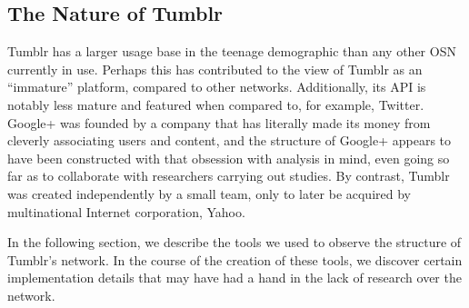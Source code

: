 \subsection{The Nature of Tumblr}
Tumblr has a larger usage base in the teenage 
demographic\cite{glenn2013more} than any other OSN currently in use.  
Perhaps this has contributed to the view of Tumblr as an ``immature'' 
platform, compared to other networks.  Additionally, its API is 
notably less mature and featured when compared to, for example, 
Twitter.  Google+ was founded by a company that has literally made 
its money from cleverly associating users and content, and the 
structure of Google+ appears to have been constructed with that 
obsession with analysis in mind, even going so far as to collaborate 
with researchers carrying out studies\cite{kairam2012talking}.  By 
contrast, Tumblr was created independently by a small team, only to 
later be acquired by multinational Internet corporation, Yahoo.

In the following section, we describe the tools we used to observe the 
structure of Tumblr's network.  In the course of the creation of these 
tools, we discover certain implementation details that may have had 
a hand in the lack of research over the network. 


